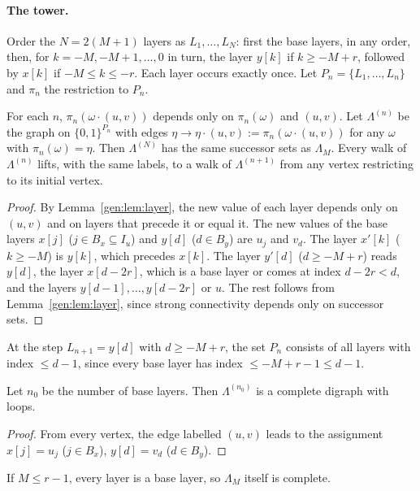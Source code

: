 \paragraph{The tower.} Order the $N=2(M+1)$ layers as $L_1,\dots,L_N$: first the base layers, in any order, then, for $k=-M,-M+1,\dots,0$ in turn, the layer $y[k]$ if $k\ge-M+r$, followed by $x[k]$ if $-M\le k\le-r$. Each layer occurs exactly once. Let $P_n=\{L_1,\dots,L_n\}$ and $\pi_n$ the restriction to $P_n$.

\begin{lemma}\label{gen:lem:tower}
For each $n$, $\pi_n(\omega\cdot(u,v))$ depends only on $\pi_n(\omega)$ and $(u,v)$. Let $\Lambda^{(n)}$ be the graph on $\{0,1\}^{P_n}$ with edges $\eta\to\eta\cdot(u,v):=\pi_n(\omega\cdot(u,v))$ for any $\omega$ with $\pi_n(\omega)=\eta$. Then $\Lambda^{(N)}$ has the same successor sets as $\Lambda_M$. Every walk of $\Lambda^{(n)}$ lifts, with the same labels, to a walk of $\Lambda^{(n+1)}$ from any vertex restricting to its initial vertex.
\end{lemma}

\begin{proof}
By Lemma~\ref{gen:lem:layer}, the new value of each layer depends only on $(u,v)$ and on layers that precede it or equal it. The new values of the base layers $x[j]$ ($j\in B_x\subseteq I_u$) and $y[d]$ ($d\in B_y$) are $u_j$ and $v_d$. The layer $x'[k]$ ($k\ge-M$) is $y[k]$, which precedes $x[k]$. The layer $y'[d]$ ($d\ge-M+r$) reads $y[d]$, the layer $x[d-2r]$, which is a base layer or comes at index $d-2r<d$, and the layers $y[d-1],\dots,y[d-2r]$ or $u$. The rest follows from Lemma~\ref{gen:lem:layer}, since strong connectivity depends only on successor sets.
\end{proof}

At the step $L_{n+1}=y[d]$ with $d\ge-M+r$, the set $P_n$ consists of all layers with index $\le d-1$, since every base layer has index $\le-M+r-1\le d-1$.

\begin{lemma}\label{gen:lem:base}
Let $n_0$ be the number of base layers. Then $\Lambda^{(n_0)}$ is a complete digraph with loops.
\end{lemma}

\begin{proof}
From every vertex, the edge labelled $(u,v)$ leads to the assignment $x[j]=u_j$ ($j\in B_x$), $y[d]=v_d$ ($d\in B_y$).
\end{proof}

If $M\le r-1$, every layer is a base layer, so $\Lambda_M$ itself is complete.


